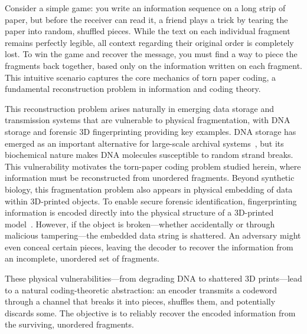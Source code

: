 \documentclass[journal,letterpaper,onecolumn,11pt]{IEEEtran}
\begin{document}
 
Consider a simple game: you write an information sequence on a long strip of paper, but before the receiver can read it, a friend plays a trick by tearing the paper into random, shuffled pieces. 
While the text on each individual fragment remains perfectly legible, all context regarding their original order is completely lost. 
To win the game and recover the message, you must find a way to piece the fragments back together, based only on the information written on each fragment.
This intuitive scenario captures the core mechanics of torn paper coding, a fundamental reconstruction problem in information and coding theory.

This reconstruction problem arises naturally in emerging data storage and transmission systems that are vulnerable to physical fragmentation, with DNA storage and forensic 3D fingerprinting providing key examples.
DNA storage has emerged as an important alternative for large-scale archival systems~\cite{douglas2012logic,goldman2013towards,blawat2016forward,antkowiak2020low}, but its biochemical nature makes DNA molecules susceptible to random strand breaks. This vulnerability motivates the torn-paper coding problem studied herein, where information must be reconstructed from unordered fragments.
Beyond synthetic biology, this fragmentation problem also appears in physical embedding of data within 3D-printed objects. 
To enable secure forensic identification, fingerprinting information is encoded directly into the physical structure of a 3D-printed model~\cite{wang2024secureinformationembeddingextraction}.
However, if the object is broken---whether accidentally or through malicious tampering---the embedded data string is shattered. 
An adversary might even conceal certain pieces, leaving the decoder to recover the information from an incomplete, unordered set of fragments.

These physical vulnerabilities—from degrading DNA to shattered 3D prints—lead to a natural coding-theoretic abstraction: an encoder transmits a codeword through a channel that breaks it into pieces, shuffles them, and potentially discards some. The objective is to reliably recover the encoded information from the surviving, unordered fragments.
\end{document}
